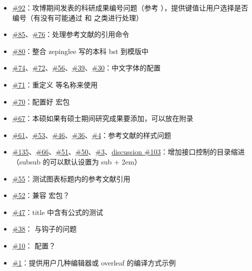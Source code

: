 \begin{itemize}
  \item \href{https://github.com/whutug/whu-thesis/issues/92}{\#92}：攻博期间发表的科研成果编号问题（参考 ），提供键值让用户选择是否编号（有没有可能通过  和  之类进行处理）
  \item \href{https://github.com/whutug/whu-thesis/issues/85}{\#85}、\href{https://github.com/whutug/whu-thesis/issues/76}{\#76}：处理参考文献的引用命令
  \item \href{https://github.com/whutug/whu-thesis/issues/80}{\#80}：整合 zepinglee 写的本科 bst 到模版中
  \item \href{https://github.com/whutug/whu-thesis/issues/74}{\#74}、\href{https://github.com/whutug/whu-thesis/issues/72}{\#72}、\href{https://github.com/whutug/whu-thesis/issues/56}{\#56}、\href{https://github.com/whutug/whu-thesis/issues/39}{\#39}、\href{https://github.com/whutug/whu-thesis/issues/30}{\#30}：中文字体的配置
  \item \href{https://github.com/whutug/whu-thesis/issues/71}{\#71}：重定义  等名称来使用 
  \item \href{https://github.com/whutug/whu-thesis/issues/70}{\#70}：配置好  宏包
  \item \href{https://github.com/whutug/whu-thesis/issues/67}{\#67}：本硕如果有硕士期间研究成果要添加，可以放在附录
  \item \href{https://github.com/whutug/whu-thesis/issues/61}{\#61}、\href{https://github.com/whutug/whu-thesis/issues/53}{\#53}、\href{https://github.com/whutug/whu-thesis/issues/46}{\#46}、\href{https://github.com/whutug/whu-thesis/issues/36}{\#36}、\href{https://github.com/whutug/whu-thesis/issues/4}{\#4}：参考文献的样式问题
  \item \href{https://github.com/whutug/whu-thesis/issues/135}{\#135}、\href{https://github.com/whutug/whu-thesis/issues/66}{\#66}、\href{https://github.com/whutug/whu-thesis/issues/51}{\#51}、\href{https://github.com/whutug/whu-thesis/issues/50}{\#50}、\href{https://github.com/whutug/whu-thesis/issues/3}{\#3}、\href{https://github.com/whutug/whu-thesis/discussions/103}{discussion \#103}：增加接口控制的目录缩进（subsub 的可以默认设置为 sub + 2em）
  \item \href{https://github.com/whutug/whu-thesis/issues/55}{\#55}：测试图表标题内的参考文献引用
  \item \href{https://github.com/whutug/whu-thesis/issues/52}{\#52}：兼容  宏包？
  \item \href{https://github.com/whutug/whu-thesis/issues/47}{\#47}：title 中含有公式的测试
  \item \href{https://github.com/whutug/whu-thesis/issues/38}{\#38}： 与钩子的问题
  \item \href{https://github.com/whutug/whu-thesis/issues/10}{\#10}： 配置？
  \item \href{https://github.com/whutug/whu-thesis/issues/1}{\#1}：提供用户几种编辑器或 overleaf 的编译方式示例
\end{itemize}


